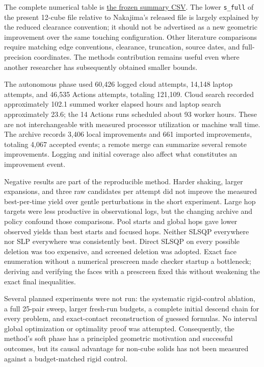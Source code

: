 \documentclass[11pt,a4paper]{article}
\begin{document}
The complete numerical table is \href{https://github.com/alejandrozu/platonic-packing/blob/e15b496ae7306287e0e70bb5b14be79f5dfdde84/records/SUMMARY.csv}{the frozen summary CSV}. The lower \nolinkurl{s_full} of the present 12-cube file relative to Nakajima's released file is largely explained by the reduced clearance convention; it should not be advertised as a new geometric improvement over the same touching configuration. Other literature comparisons require matching edge conventions, clearance, truncation, source dates, and full-precision coordinates. The methods contribution remains useful even where another researcher has subsequently obtained smaller bounds.

The autonomous phase used 60,426 logged cloud attempts, 14,148 laptop attempts, and 46,535 Actions attempts, totaling 121,109. Cloud search recorded approximately 102.1 summed worker elapsed hours and laptop search approximately 23.6; the 14 Actions runs scheduled about 93 worker hours. These are not interchangeable with measured processor utilization or machine wall time. The archive records 3,406 local improvements and 661 imported improvements, totaling 4,067 accepted events; a remote merge can summarize several remote improvements. Logging and initial coverage also affect what constitutes an improvement event.

Negative results are part of the reproducible method. Harder shaking, larger expansions, and three raw candidates per attempt did not improve the measured best-per-time yield over gentle perturbations in the short experiment. Large hop targets were less productive in observational logs, but the changing archive and policy confound those comparisons. Pool starts and global hops gave lower observed yields than best starts and focused hops. Neither SLSQP everywhere nor SLP everywhere was consistently best. Direct SLSQP on every possible deletion was too expensive, and screened deletion was adopted. Exact face enumeration without a numerical prescreen made checker startup a bottleneck; deriving and verifying the faces with a prescreen fixed this without weakening the exact final inequalities.

Several planned experiments were not run: the systematic rigid-control ablation, a full 25-pair sweep, larger fresh-run budgets, a complete initial descend chain for every problem, and exact-contact reconstruction of guessed formulas. No interval global optimization or optimality proof was attempted. Consequently, the method's soft phase has a principled geometric motivation and successful outcomes, but its causal advantage for non-cube solids has not been measured against a budget-matched rigid control.
\end{document}
